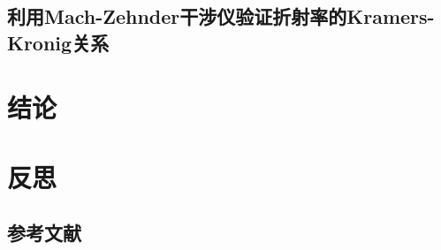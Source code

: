 \documentclass[a4paper, 10pt]{article}
\begin{document}
\begin{multicols}{2}
\subsection{利用Mach-Zehnder干涉仪验证折射率的Kramers-Kronig关系}

\section{结论}

\section{反思}

\begin{appendix}
\section{参考文献}

\end{appendix}
\end{multicols}
\end{document}
